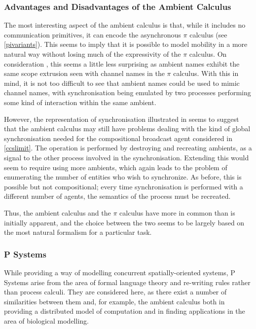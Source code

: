 \subsubsection{Advantages and Disadvantages of the Ambient Calculus}

The most interesting aspect of the ambient calculus is that, while it
includes no communication primitives, it can encode the asynchronous
$\pi$ calculus (see \ref{pivariants}).  This seems to imply that it is
possible to model mobility in a more natural way without losing much of
the expressivity of the $\pi$ calculus.  On consideration , this seems a
little less surprising as ambient names exhibit the same scope extrusion
seen with channel names in the $\pi$ calculus.  With this in mind, it is
not too difficult to see that ambient names could be used to mimic
channel names, with synchronisation being emulated by two processes
performing some kind of interaction within the same ambient.

However, the representation of synchronisation illustrated in \cite{amb}
seems to suggest that the ambient calculus may still have problems
dealing with the kind of global synchronisation needed for the
compositional broadcast agent considered in \ref{ccslimit}.  The
operation is performed by destroying and recreating ambients, as a
signal to the other process involved in the synchronisation.  Extending
this would seem to require using more ambients, which again leads to the
problem of enumerating the number of entities who wish to synchronize.
As before, this is possible but not compositional; every time
synchronisation is performed with a different number of agents, the
semantics of the process must be recreated.

Thus, the ambient calculus and the $\pi$ calculus have more in common
than is initially apparent, and the choice between the two seems to be
largely based on the most natural formalism for a particular task.



\subsubsection{P Systems}
\label{psystems}

While providing a way of modelling concurrent spatially-oriented
systems, P Systems \cite{paun:98membranes} arise from the area of formal
language theory and re-writing rules rather than process
calculi.  They are considered here, as there exist a number of
similarities between them and, for example, the ambient calculus both in
providing a distributed model of computation and in finding applications
in the area of biological modelling.

